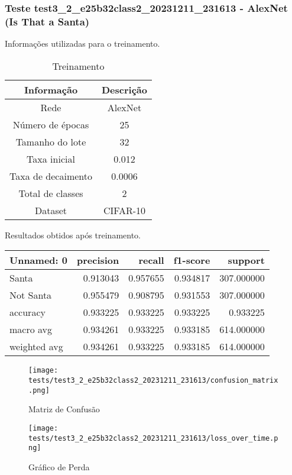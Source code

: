 \subsubsection{Teste test3_2_e25b32class2_20231211_231613 - AlexNet (Is That a Santa)}

Informações utilizadas para o treinamento.

\begin{table}[ht]
   \centering
   \caption{Treinamento}
   \label{tab:modelos}
   \begin{tabular}{| c | c | }
      \hline 
      \textbf{Informação} & \textbf{Descrição} \\
      \hline \hline 
      Rede & AlexNet \\
      \hline
      Número de épocas & 25\\
      \hline
      Tamanho do lote & 32\\
      \hline
      Taxa inicial & 0.012 \\
      \hline
      Taxa de decaimento & 0.0006 \\
      \hline
      Total de classes & 2\\
      \hline
      Dataset & CIFAR-10\\
      \hline
   \end{tabular} 
\end{table}

Resultados obtidos após treinamento.

\begin{tabular}{lrrrr}
\toprule
  Unnamed: 0 &  precision &   recall &  f1-score &    support \\
\midrule
       Santa &   0.913043 & 0.957655 &  0.934817 & 307.000000 \\
   Not Santa &   0.955479 & 0.908795 &  0.931553 & 307.000000 \\
    accuracy &   0.933225 & 0.933225 &  0.933225 &   0.933225 \\
   macro avg &   0.934261 & 0.933225 &  0.933185 & 614.000000 \\
weighted avg &   0.934261 & 0.933225 &  0.933185 & 614.000000 \\
\bottomrule
\end{tabular}


\begin{figure}[ht]
 \begin{center}
   \texttt{[image: tests/test3\_2\_e25b32class2\_20231211\_231613/confusion\_matrix.png]}
  \caption{Matriz de Confusão}
  \label{fig:fig03}
 \end{center}
\end{figure}

\begin{figure}[ht]
 \begin{center}
   \texttt{[image: tests/test3\_2\_e25b32class2\_20231211\_231613/loss\_over\_time.png]}
  \caption{Gráfico de Perda}
  \label{fig:fig04}
 \end{center}
\end{figure}
